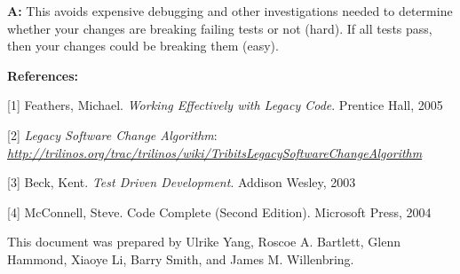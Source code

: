 \documentclass[]{article}
\begin{document}
\textbf{A:} This avoids expensive debugging and other investigations
needed to determine whether your changes are breaking failing tests or
not (hard). If all tests pass, then your changes could be breaking them
(easy).

\protect\hypertarget{h.9qg5mj337055}{}{}\textbf{References:}

\protect\hypertarget{h.f53m6pxt4rgc}{}{}{[}1{]} Feathers, Michael.
\emph{Working Effectively with Legacy Code}. Prentice Hall, 2005

\protect\hypertarget{h.f34rnf2pj2lo}{}{}{[}2{]} \emph{Legacy Software
Change Algorithm}:
\href{http://trilinos.org/trac/trilinos/wiki/TribitsLegacySoftwareChangeAlgorithm}{\emph{http://trilinos.org/trac/trilinos/wiki/TribitsLegacySoftwareChangeAlgorithm}}

\protect\hypertarget{h.y70wa5kslzka}{}{}{[}3{]} Beck, Kent. \emph{Test
Driven Development}. Addison Wesley, 2003

\protect\hypertarget{h.yohf9hj1puj4}{}{}{[}4{]} McConnell, Steve. Code
Complete (Second Edition). Microsoft Press, 2004

\protect\hypertarget{h.hhclote3u0dy}{}{}

\protect\hypertarget{h.ksyrwlxj2kmg}{}{}This document was prepared by
Ulrike Yang, Roscoe A. Bartlett, Glenn Hammond, Xiaoye Li, Barry Smith,
and James M. Willenbring.
\end{document}

